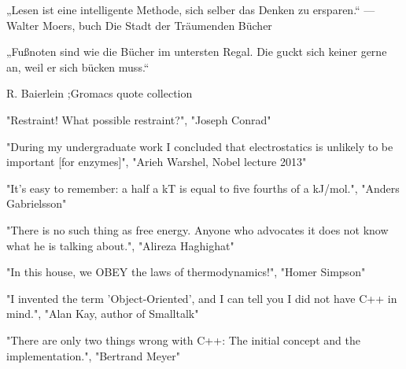 


„Lesen ist eine intelligente Methode, sich selber das Denken zu ersparen.“ — Walter Moers, buch Die Stadt der Träumenden Bücher

„Fußnoten sind wie die Bücher im untersten Regal. Die guckt sich keiner gerne an, weil er sich bücken muss.“

{R. Baierlein ;Gromacs quote collection \cite{Abraham2015}}



"Restraint! What possible restraint?", "Joseph Conrad"

"During my undergraduate work I concluded that electrostatics is unlikely to be important [for enzymes]",
"Arieh Warshel, Nobel lecture 2013" 


"It's easy to remember: a half a kT is equal to five fourths of a kJ/mol.",
          "Anders Gabrielsson"
          
"There is no such thing as free energy. Anyone who advocates it does not know what he is talking about.",
          "Alireza Haghighat" 
              
"In this house, we OBEY the laws of thermodynamics!", "Homer Simpson"



"I invented the term 'Object-Oriented', and I can tell you I did not have C++ in mind.",
          "Alan Kay, author of Smalltalk"
          
"There are only two things wrong with C++:  The initial concept and the implementation.",
          "Bertrand Meyer"
      
